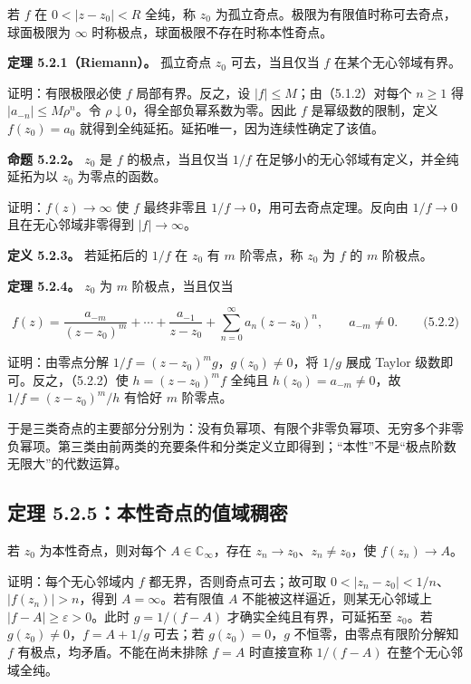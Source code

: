 \documentclass[11pt,a4paper]{article}
\begin{document}
若 \(f\) 在 \(0<|z-z_0|<R\) 全纯，称 \(z_0\)
为孤立奇点。极限为有限值时称可去奇点，球面极限为 \(\infty\)
时称极点，球面极限不存在时称本性奇点。

\textbf{定理 5.2.1（Riemann）。} 孤立奇点 \(z_0\) 可去，当且仅当 \(f\)
在某个无心邻域有界。

证明：有限极限必使 \(f\) 局部有界。反之，设
\(|f|\le M\)；由（5.1.2）对每个 \(n\ge1\) 得 \(|a_{-n}|\le M\rho^n\)。令
\(\rho\downarrow0\)，得全部负幂系数为零。因此 \(f\) 是幂级数的限制，定义
\(f(z_0)=a_0\) 就得到全纯延拓。延拓唯一，因为连续性确定了该值。

\textbf{命题 5.2.2。} \(z_0\) 是 \(f\) 的极点，当且仅当 \(1/f\)
在足够小的无心邻域有定义，并全纯延拓为以 \(z_0\) 为零点的函数。

证明：\(f(z)\to\infty\) 使 \(f\) 最终非零且
\(1/f\to0\)，用可去奇点定理。反向由 \(1/f\to0\) 且在无心邻域非零得到
\(|f|\to\infty\)。

\textbf{定义 5.2.3。} 若延拓后的 \(1/f\) 在 \(z_0\) 有 \(m\) 阶零点，称
\(z_0\) 为 \(f\) 的 \(m\) 阶极点。

\textbf{定理 5.2.4。} \(z_0\) 为 \(m\) 阶极点，当且仅当

\[
f(z)=\frac{a_{-m}}{(z-z_0)^m}+\cdots+\frac{a_{-1}}{z-z_0}
+\sum_{n=0}^{\infty}a_n(z-z_0)^n,\qquad a_{-m}\ne0.
\qquad\text{(5.2.2)}
\]

证明：由零点分解 \(1/f=(z-z_0)^m g\)，\(g(z_0)\ne0\)，将 \(1/g\) 展成
Taylor 级数即可。反之，（5.2.2）使 \(h=(z-z_0)^m f\) 全纯且
\(h(z_0)=a_{-m}\ne0\)，故 \(1/f=(z-z_0)^m/h\) 有恰好 \(m\) 阶零点。

于是三类奇点的主要部分分别为：没有负幂项、有限个非零负幂项、无穷多个非零负幂项。第三类由前两类的充要条件和分类定义立即得到；``本性''不是``极点阶数无限大''的代数运算。

\subsection{定理 5.2.5：本性奇点的值域稠密}\label{ch05-s2-heading-2}

若 \(z_0\) 为本性奇点，则对每个 \(A\in\mathbb C_\infty\)，存在
\(z_n\to z_0\)、\(z_n\ne z_0\)，使 \(f(z_n)\to A\)。

证明：每个无心邻域内 \(f\) 都无界，否则奇点可去；故可取
\(0<|z_n-z_0|<1/n\)、\(|f(z_n)|>n\)，得到 \(A=\infty\)。若有限值 \(A\)
不能被这样逼近，则某无心邻域上 \(|f-A|\ge\varepsilon>0\)。此时
\(g=1/(f-A)\) 才确实全纯且有界，可延拓至 \(z_0\)。若
\(g(z_0)\ne0\)，\(f=A+1/g\) 可去；若 \(g(z_0)=0\)，\(g\)
不恒零，由零点有限阶分解知 \(f\) 有极点，均矛盾。不能在尚未排除 \(f=A\)
时直接宣称 \(1/(f-A)\) 在整个无心邻域全纯。
\end{document}
